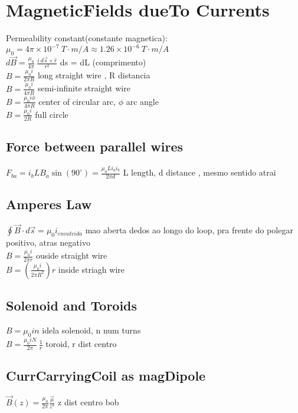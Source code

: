 \section{MagneticFields dueTo Currents}
Permeability constant(constante magnetica): $\mu _0=4\pi \times 10^{-7}\:T\cdot m/A\approx 1.26\times 10^{-6}\:T\cdot m/A$\\
$d\vec{B}=\frac{\mu _0}{4\pi }\:\frac{i\:d\vec{s}\times \widehat{r}}{r^2}$ ds = dL (comprimento)\\
$B=\frac{\mu _0i}{2\pi R}$ long straight wire , R distancia\\
$B=\frac{\mu _0i}{4\pi R}$ semi-infinite straight wire\\
$B=\frac{\mu _0i\phi }{4\pi R}$ center of circular arc, $\phi$ arc angle\\
$B=\frac{\mu _0i}{2R}$ full circle\\
\subsection{Force between parallel wires}
$F_{ba}=i_bLB_a\sin \left(90^{\circ }\right)=\frac{\mu _0Li_ai_b}{2\pi d}$ L length, d distance , mesmo sentido atrai\\
\subsection{Amperes Law}
$\oint \vec{B}\cdot d\vec{s}=\mu _0i_{envolvida}$ mao aberta dedos ao longo do loop, pra frente do polegar positivo, atras negativo\\
$B=\frac{\mu _0i}{2\pi r}$ ouside straight wire\\
$B=\left(\frac{\mu _0i}{2\pi R^2}\right)r$ inside striagh wire\\
\subsection{Solenoid and Toroids}
$B=\mu _0in$ idela solenoid, n num turns\\
$B=\frac{\mu _0iN}{2\pi }\:\frac{1}{r}$ toroid, r dist centro\\
\subsection{CurrCarryingCoil as magDipole}
$\vec{B}\left(z\right)=\frac{\mu _0}{2\pi }\frac{\vec{\mu }}{z^3}$ z dist centro bob\\
